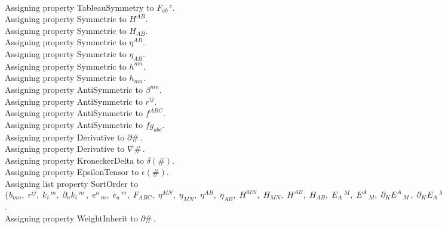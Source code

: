 \documentclass[11pt]{article}
\begin{document}
\\
Assigning property TableauSymmetry to ${F}_{a b}\,^{c}$.
\\
Assigning property Symmetric to ${H}^{A B}$.
\\
Assigning property Symmetric to ${H}_{A B}$.
\\
Assigning property Symmetric to ${\eta}^{A B}$.
\\
Assigning property Symmetric to ${\eta}_{A B}$.
\\
Assigning property Symmetric to ${h}^{m n}$.
\\
Assigning property Symmetric to ${h}_{m n}$.
\\
Assigning property AntiSymmetric to ${\beta}^{m n}$.
\\
Assigning property AntiSymmetric to ${r}^{i j}$.
\\
Assigning property AntiSymmetric to ${f}^{A B C}$.
\\
Assigning property AntiSymmetric to ${fg}_{a b c}$.
\\
Assigning property Derivative to $\partial{\#}\, $.
\\
Assigning property Derivative to $\nabla{\#}\, $.
\\
Assigning property KroneckerDelta to $\delta(\#)$.
\\
Assigning property EpsilonTensor to $\epsilon(\#)$.
\\
Assigning list property SortOrder to $\{{b}_{m n},\; {r}^{i j},\; {k}_{i}\,^{m},\; {\partial}_{n}{{k}_{i}\,^{m}}\, ,\; {e}^{a}\,_{m},\; {e}_{a}\,^{m},\; {F}_{A B C},\; {\eta}^{M N},\; {\eta}_{M N},\; {\eta}^{A B},\; {\eta}_{A B},\; {H}^{M N},\; {H}_{M N},\; {H}^{A B},\; {H}_{A B},\; {E}_{A}\,^{M},\; {E}^{A}\,_{M},\; {\partial}_{K}{{E}^{A}\,_{M}}\, ,\; {\partial}_{K}{{E}_{A}\,^{M}}\, ,\; {\partial}_{K L}{{E}_{A}\,^{M}}\, \}$.
\\
Assigning property WeightInherit to $\partial{\#}\, $.
\end{document}
